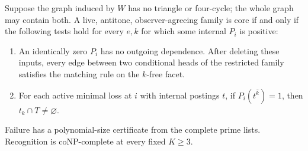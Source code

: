 \begin{theorem}
\label{core:thm:conditional-girth-five}
Suppose the graph induced by $W$ has no triangle or four-cycle;
the whole graph may contain both. A live, antitone, observer-agreeing
family is core if and only if the following tests hold for every $e,k$
for which some internal $P_i$ is positive:
\begin{enumerate}
\item An identically zero $P_i$ has no outgoing dependence. After
deleting these inputs, every edge between two conditional heads of
the restricted family satisfies the matching rule on the $k$-free facet.
\item For each active minimal loss at $i$ with internal postings $t$,
if $P_i(t^{\widehat k})=1$, then $t_k\cap T\ne\varnothing$.
\end{enumerate}
Failure has a polynomial-size certificate from the complete prime
lists. Recognition is coNP-complete at every fixed $K\ge3$.
\end{theorem}
